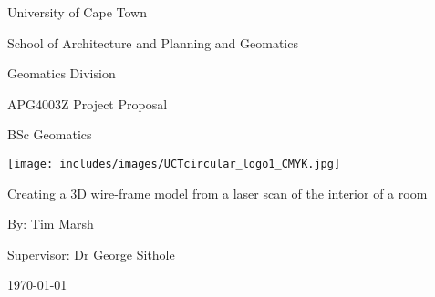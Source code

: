 
\begin{center}
{\Huge University of Cape Town}
\linebreak \linebreak

{\LARGE School of Architecture and Planning and Geomatics}
\linebreak \linebreak

{\Large Geomatics Division}
\linebreak \linebreak


{\Large APG4003Z Project Proposal}
\linebreak

{\Large BSc Geomatics}
\linebreak \linebreak

\begin{center}
\texttt{[image: includes/images/UCTcircular\_logo1\_CMYK.jpg]}
\linebreak \linebreak
\end{center}

{\Large Creating a 3D wire-frame model from a laser scan of the interior of a room}
\linebreak \linebreak

{\Large By: Tim Marsh}
\linebreak \linebreak

{\Large Supervisor: Dr George Sithole}
\linebreak \linebreak

{\Large \today}

\end{center}
